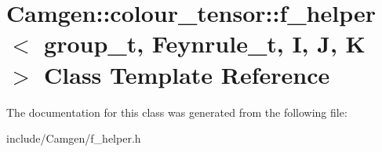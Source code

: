 \hypertarget{a00215}{\section{Camgen\-:\-:colour\-\_\-tensor\-:\-:f\-\_\-helper$<$ group\-\_\-t, Feynrule\-\_\-t, I, J, K $>$ Class Template Reference}
\label{a00215}
}


The documentation for this class was generated from the following file\-:\begin{DoxyCompactItemize}
\item 
include/\-Camgen/f\-\_\-helper.\-h\end{DoxyCompactItemize}
